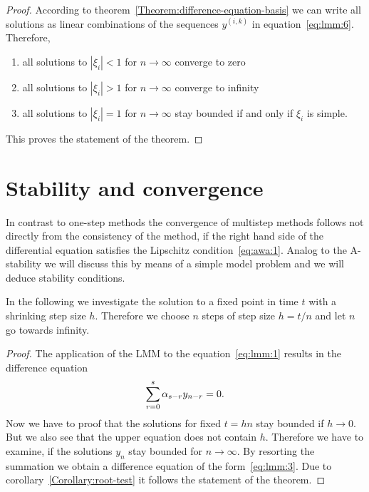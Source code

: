 

\begin{proof}
  According to theorem~\ref{Theorem:difference-equation-basis} we can write all solutions
  as linear combinations of the sequences $y^{(i,k)}$ in
  equation~\eqref{eq:lmm:6}. Therefore,
  \begin{enumerate}
  \item all solutions to $|\xi_i|<1$ for $n\to\infty$ converge to zero
  \item all solutions to $|\xi_i|>1$ for $n\to\infty$ converge to infinity
  \item all solutions to $|\xi_i|=1$ for $n\to\infty$ stay bounded 
	if and only if $\xi_i$ is simple.
  \end{enumerate}
  This proves the statement of the theorem.
\end{proof}

\section{Stability and convergence}

\begin{remark}
  In contrast to one-step methods the convergence of multistep methods
  follows not directly from the consistency of the method, if the
  right hand side of the differential equation satisfies the Lipschitz
  condition~\eqref{eq:awa:1}.  Analog to the A-stability we will
  discuss this by means of a simple model problem and we will deduce
  stability conditions.
\end{remark}

\begin{remark}
  In the following we investigate the solution to a fixed point in time
  $t$ with a shrinking step size $h$. Therefore we choose $n$
  steps of step size $h = t/n$ and let $n$ go towards infinity.
\end{remark}




\begin{proof}
  The application of the LMM to the equation~\eqref{eq:lmm:1} results
  in the difference equation
  \begin{gather*}
    \sum_{r=0}^{s} \alpha_{s-r} y_{n-r} = 0.
  \end{gather*}
  Now we have to proof that the solutions for fixed $t = h n$ stay
  bounded if $h\to 0$. But we also see that the upper equation does
  not contain $h$. Therefore we have to examine, if the solutions
  $y_n$ stay bounded for $n\to \infty$.  By resorting the summation we
  obtain a difference equation of the form~\eqref{eq:lmm:3}. Due to
  corollary~\ref{Corollary:root-test} it follows the statement of the theorem.
\end{proof}

